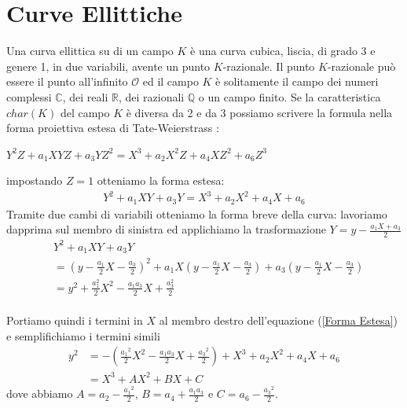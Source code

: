 \documentclass[a4paper,12pt]{tesiinfo}
\newcommand\ddfrac[2]{\frac{\displaystyle #1}{\displaystyle #2}}
\begin{document}
\chapter{Curve Ellittiche}
\label{cap curve ellittiche}
Una curva ellittica su di un campo $K$ \`e una curva cubica, liscia, di grado 3 e genere 1, in due variabili, avente un punto $K$-razionale. Il punto $K$-razionale pu\`o essere il punto all'infinito $\mathcal{O}$ ed il campo $K$ \`e solitamente il campo dei numeri complessi $\mathbb{C}$, dei reali $\mathbb{R}$, dei razionali $\mathbb{Q}$ o un campo finito. Se la caratteristica $char(K)$ del campo $K$ \`e diversa da 2 e da 3 possiamo scrivere la formula nella forma proiettiva estesa di Tate-Weierstrass \cite{Tate-Weier EQ}:
\begin{center}
$Y^{2}Z + a_1XYZ + a_3YZ^2 =X^3 + a_2X^2Z + a_4XZ^2 + a_6Z^3$
\end{center}
impostando $Z=1$ otteniamo la forma estesa: 
\begin{gather}
Y^{2} + a_1XY + a_3Y =X^3 + a_2X^2 + a_4X + a_6
\label{Forma Estesa}
\end{gather}
Tramite due cambi di variabili otteniamo la forma breve della curva: lavoriamo dapprima sul membro di sinistra ed applichiamo la trasformazione $Y = y - \ddfrac{a_1X + a_3}{2}$
\begin{align*}
&Y^{2} + a_1XY + a_3Y 
\\ 
&= \left ( y - \ddfrac{a_1}{2}X - \ddfrac{a_3}{2} \right )^2 + a_1X \left ( y - \ddfrac{a_1}{2}X - \ddfrac{a_3}{2} \right ) + a_3 \left ( y - \ddfrac{a_1}{2}X - \ddfrac{a_3}{2} \right ) 
\\
&= y^2 + \ddfrac{a_1^2}{2}X^2 - \ddfrac{a_1a_3}{2}X +\ddfrac{a_3^2}{2} 
\end{align*}
\\
Portiamo quindi i termini in $X$ al membro destro dell'equazione (\ref{Forma Estesa}) e semplifichiamo i termini simili
\begin{align*}
y^2 &= - \left ( \ddfrac{{a_1}^2}{2}X^2 - \ddfrac{a_1a_3}{2}X +\ddfrac{{a_3}^2}{2} \right ) + X^3 + a_2X^2 + a_4X + a_6
\\
&= X^3 + AX^2 + BX + C 
\end{align*}
dove abbiamo $A = a_2 - \ddfrac{{a_1}^2}{2}$, $B = a_4 + \ddfrac{a_1a_3}{2}$ e $C = a_6 - \ddfrac{{a_3}^2}{2}$.
\end{document}

